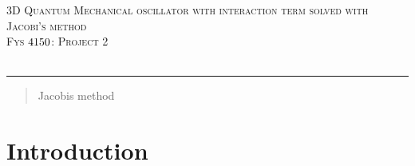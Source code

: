 \documentclass[a4paper,11pt]{article}
\newcommand*{\boisik}{\fontfamily{bsk}\selectfont} %
\begin{document}
{
\SetBgVshift{-1.2cm}
\SetBgHshift{-10.5cm}
$$\:$$
\begin{center}
	\vspace{0.2cm}%
	\fontsize{15}{15}\selectfont \textsc{ 3D Quantum Mechanical oscillator with interaction term solved with Jacobi's method}\\
	\fontsize{13}{13}\selectfont \textsc{Fys $\textnormal{{4150}}$: Project 2}\\
	\vspace{0.4cm}
	\fontsize{12}{12}\\
	\vspace{0.5cm}
\end{center}
	
\rule{\textwidth}{0.3pt}\par
		
\begin{abstract}
	Jacobis method
\end{abstract}



		
\section*{Introduction}
		
		
		
		
}
\end{document}
